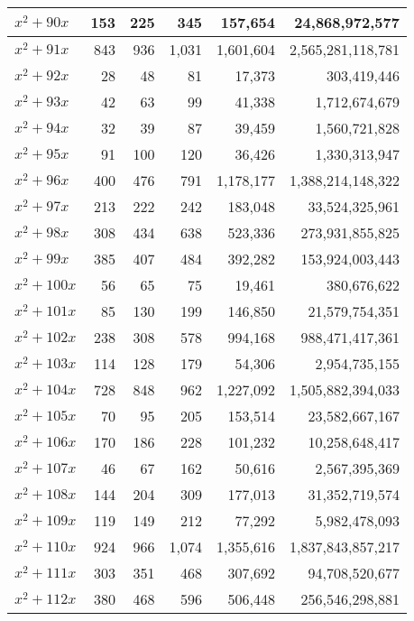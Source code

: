 \documentclass[a4paper]{amsproc}
\theoremstyle{plain}
\begin{document}
\begin{longtable}{ | l | r | r | r | r | r | }
$x^2 + 90x$ & 153 & 225 & 345 & 157{,}654 & 24{,}868{,}972{,}577 \\ \hline
$x^2 + 91x$ & 843 & 936 & 1{,}031 & 1{,}601{,}604 & 2{,}565{,}281{,}118{,}781 \\ \hline
$x^2 + 92x$ & 28 & 48 & 81 & 17{,}373 & 303{,}419{,}446 \\ \hline
$x^2 + 93x$ & 42 & 63 & 99 & 41{,}338 & 1{,}712{,}674{,}679 \\ \hline
$x^2 + 94x$ & 32 & 39 & 87 & 39{,}459 & 1{,}560{,}721{,}828 \\ \hline
$x^2 + 95x$ & 91 & 100 & 120 & 36{,}426 & 1{,}330{,}313{,}947 \\ \hline
$x^2 + 96x$ & 400 & 476 & 791 & 1{,}178{,}177 & 1{,}388{,}214{,}148{,}322 \\ \hline
$x^2 + 97x$ & 213 & 222 & 242 & 183{,}048 & 33{,}524{,}325{,}961 \\ \hline
$x^2 + 98x$ & 308 & 434 & 638 & 523{,}336 & 273{,}931{,}855{,}825 \\ \hline
$x^2 + 99x$ & 385 & 407 & 484 & 392{,}282 & 153{,}924{,}003{,}443 \\ \hline
$x^2 + 100x$ & 56 & 65 & 75 & 19{,}461 & 380{,}676{,}622 \\ \hline
$x^2 + 101x$ & 85 & 130 & 199 & 146{,}850 & 21{,}579{,}754{,}351 \\ \hline
$x^2 + 102x$ & 238 & 308 & 578 & 994{,}168 & 988{,}471{,}417{,}361 \\ \hline
$x^2 + 103x$ & 114 & 128 & 179 & 54{,}306 & 2{,}954{,}735{,}155 \\ \hline
$x^2 + 104x$ & 728 & 848 & 962 & 1{,}227{,}092 & 1{,}505{,}882{,}394{,}033 \\ \hline
$x^2 + 105x$ & 70 & 95 & 205 & 153{,}514 & 23{,}582{,}667{,}167 \\ \hline
$x^2 + 106x$ & 170 & 186 & 228 & 101{,}232 & 10{,}258{,}648{,}417 \\ \hline
$x^2 + 107x$ & 46 & 67 & 162 & 50{,}616 & 2{,}567{,}395{,}369 \\ \hline
$x^2 + 108x$ & 144 & 204 & 309 & 177{,}013 & 31{,}352{,}719{,}574 \\ \hline
$x^2 + 109x$ & 119 & 149 & 212 & 77{,}292 & 5{,}982{,}478{,}093 \\ \hline
$x^2 + 110x$ & 924 & 966 & 1{,}074 & 1{,}355{,}616 & 1{,}837{,}843{,}857{,}217 \\ \hline
$x^2 + 111x$ & 303 & 351 & 468 & 307{,}692 & 94{,}708{,}520{,}677 \\ \hline
$x^2 + 112x$ & 380 & 468 & 596 & 506{,}448 & 256{,}546{,}298{,}881 \\ \hline

\end{longtable}
\end{document}
